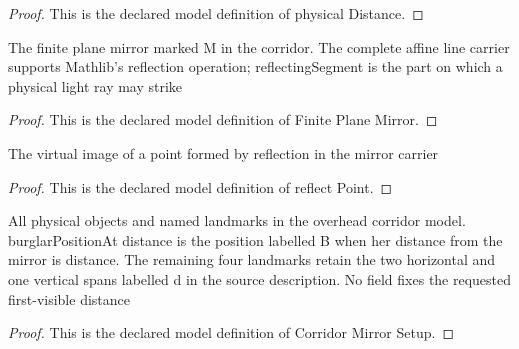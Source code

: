 \begin{proof}
  This is the declared model definition of physical Distance.
\end{proof}
\begin{definition}
  \label{def:physics:phyx-mini-0162:phyxminiproblems-problemphyxmini0162-finiteplanemirror}
  The finite plane mirror marked M in the corridor. The complete affine line carrier supports Mathlib's reflection operation; reflectingSegment is the part on which a physical light ray may strike
\end{definition}
\begin{proof}
  This is the declared model definition of Finite Plane Mirror.
\end{proof}
\begin{definition}
  \label{def:physics:phyx-mini-0162:phyxminiproblems-problemphyxmini0162-finiteplanemirror-reflectpoint}
  The virtual image of a point formed by reflection in the mirror carrier
\end{definition}
\begin{proof}
  This is the declared model definition of reflect Point.
\end{proof}
\begin{definition}
  \label{def:physics:phyx-mini-0162:phyxminiproblems-problemphyxmini0162-corridormirrorsetup}
  All physical objects and named landmarks in the overhead corridor model. burglarPositionAt distance is the position labelled B when her distance from the mirror is distance. The remaining four landmarks retain the two horizontal and one vertical spans labelled d in the source description. No field fixes the requested first-visible distance
\end{definition}
\begin{proof}
  This is the declared model definition of Corridor Mirror Setup.
\end{proof}
